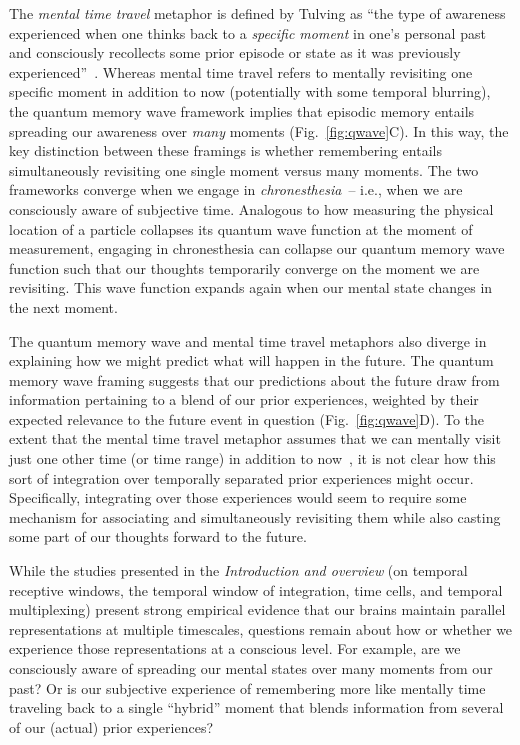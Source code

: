 \documentclass{article}
\begin{document}
The \textit{mental time travel} metaphor is defined by Tulving as ``the type of awareness experienced when one thinks back to a \textit{specific moment} in one's personal past and consciously recollects some prior episode or state as it was previously experienced''~\citep[Fig.~\ref{fig:qwave}B;][emphasis added]{WheeEtal97}.  Whereas mental time travel refers to mentally revisiting one specific moment in addition to now (potentially with some temporal blurring), the quantum memory wave framework implies that episodic memory entails spreading our awareness over \textit{many} moments (Fig.~\ref{fig:qwave}C).  In this way, the key distinction between these framings is whether remembering entails simultaneously revisiting one single moment versus many moments.  The two frameworks converge when we engage in \textit{chronesthesia}~\citep{Tulv02b}-- i.e., when we are consciously aware of subjective time.   Analogous to how measuring the physical location of a particle collapses its quantum wave function at the moment of measurement, engaging in chronesthesia can collapse our quantum memory wave function such that our thoughts temporarily converge on the moment we are revisiting.  This wave function expands again when our mental state changes in the next moment.

The quantum memory wave and mental time travel metaphors also diverge in explaining how we might predict what will happen in the future.  The quantum memory wave framing suggests that our predictions about the future draw from information pertaining to a blend of our prior experiences, weighted by their expected relevance to the future event in question (Fig.~\ref{fig:qwave}D).  To the extent that the mental time travel metaphor assumes that we can mentally visit just one other time (or time range) in addition to now~\citep[e.g.,][]{SzpuTulv11}, it is not clear how this sort of integration over temporally separated prior experiences might occur.  Specifically, integrating over those experiences would seem to require some mechanism for associating and simultaneously revisiting them while also casting some part of our thoughts forward to the future.

While the studies presented in the \textit{Introduction and overview} (on temporal receptive windows, the temporal window of integration, time cells, and temporal multiplexing) present strong empirical evidence that our brains maintain parallel representations at multiple timescales, questions remain about how or whether we experience those representations at a conscious level.  For example, are we consciously aware of spreading our mental states over many moments from our past?  Or is our subjective experience of remembering more like mentally time traveling back to a single ``hybrid'' moment that blends information from several of our (actual) prior experiences?
\end{document}
